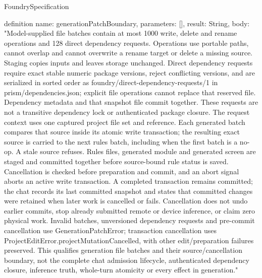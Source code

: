 \begin{lexlean}{FoundrySpecification}
\begin{semanticmodule}
definition{
  name: generationPatchBoundary,
  parameters: [],
  result: String,
  body: "Model-supplied file batches contain at most 1000 write, delete and rename operations and 128 direct dependency requests. Operations use portable paths, cannot overlap and cannot overwrite a rename target or delete a missing source. Staging copies inputs and leaves storage unchanged. Direct dependency requests require exact stable numeric package versions, reject conflicting versions, and are serialized in sorted order as foundry/direct-dependency-requests/1 in prism/dependencies.json; explicit file operations cannot replace that reserved file. Dependency metadata and that snapshot file commit together. These requests are not a transitive dependency lock or authenticated package closure. The request context uses one captured project file set and reference. Each generated batch compares that source inside its atomic write transaction; the resulting exact source is carried to the next rules batch, including when the first batch is a no-op. A stale source refuses. Rules files, generated module and generated screen are staged and committed together before source-bound rule status is saved. Cancellation is checked before preparation and commit, and an abort signal aborts an active write transaction. A completed transaction remains committed; the chat records its last committed snapshot and states that committed changes were retained when later work is cancelled or fails. Cancellation does not undo earlier commits, stop already submitted remote or device inference, or claim zero physical work. Invalid batches, unversioned dependency requests and pre-commit cancellation use GenerationPatchError; transaction cancellation uses ProjectEditError.projectMutationCancelled, with other edit/preparation failures preserved. This qualifies generation file batches and their source/cancellation boundary, not the complete chat admission lifecycle, authenticated dependency closure, inference truth, whole-turn atomicity or every effect in generation."
}


\end{semanticmodule}
\end{lexlean}
